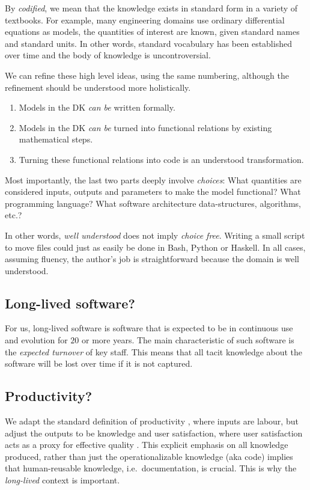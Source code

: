 \documentclass[sigconf,review,anonymous=false]{acmart}
\begin{document}
By \emph{codified}, we mean that the knowledge exists in standard form in a
variety of textbooks. For example, many engineering domains use
ordinary differential equations as models, the quantities of
interest are known, given standard names and standard units. In other words,
standard vocabulary has been established over time and the body of knowledge is
uncontroversial.

We can refine these high level ideas, using the same numbering,
although the refinement should be
understood more holistically.
\begin{enumerate}
\item Models in the DK \emph{can be} written formally.
\item Models in the DK \emph{can be} turned into functional relations by
 existing mathematical steps.
\item Turning these functional relations into code is an understood
 transformation.
\end{enumerate}
Most importantly, the last two parts
deeply involve \emph{choices}: What quantities are considered inputs, outputs
and parameters to make the model functional? What programming language?  What
software architecture data-structures, algorithms, etc.?

In other words,
\emph{well understood} does not imply \emph{choice free}.  Writing a small 
script to move files could just as easily be done in Bash, Python or Haskell.
In all cases, assuming fluency, the author's job is straightforward because
the domain is well understood.

\subsection{Long-lived software?}
For us, long-lived software is software that is expected to be in continuous
use and evolution for $20$ or more years. The main characteristic of
such software is the \emph{expected turnover} of key staff. This means that
all tacit knowledge about the software will be lost over time if it is not
captured.

\subsection{Productivity?}
We adapt the standard definition of productivity \cite{Boehm1987}, where inputs are labour,
but adjust the outputs to be knowledge and user satisfaction, where user
satisfaction acts as a proxy for effective quality
.
This explicit emphasis on all knowledge produced, rather than just the
operationalizable knowledge (aka code) 
implies that human-reusable knowledge, i.e.\ documentation, is crucial.
This is why the \emph{long-lived} context is important.
\end{document}
